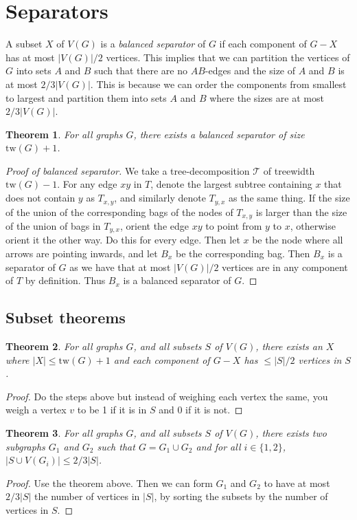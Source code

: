 \documentclass[]{article}
\newcommand{\tree}{\mathcal{T}}
\newcommand{\tw}{\text{tw}}
\newtheorem{theorem}{Theorem}
\theoremstyle{definition}
\numberwithin{theorem}{section}
\numberwithin{equation}{section}
\begin{document}
\section{Separators}
A subset $X$ of $V(G)$ is a \textit{balanced separator} of $G$ if each component of $G - X$ has at most $|V(G)|/2$ vertices. This implies that we can partition the vertices of $G$ into sets $A$ and $B$ such that there are no $AB$-edges and the size of $A$ and $B$ is at most $2/3 |V(G)|$. This is because we can order the components from smallest to largest and partition them into sets $A$ and $B$ where the sizes are at most $2/3 |V(G)|$.

\begin{theorem}
	For all graphs $G$, there exists a balanced separator of size $\tw(G) + 1$. 
\end{theorem}
\begin{proof}[Proof of balanced separator]
	We take a tree-decomposition $\tree$ of treewidth $\tw(G) - 1$. For any edge $xy$ in $T$, denote the largest subtree containing $x$ that does not contain $y$ as $T_{x,y}$, and similarly denote $T_{y, x}$ as the same thing. If the size of the union of the corresponding bags of the nodes of $T_{x,y}$ is larger than the size of the union of bags in $T_{y, x}$, orient the edge $xy$ to point from $y$ to $x$, otherwise orient it the other way. Do this for every edge. Then let $x$ be the node where all arrows are pointing inwards, and let $B_x$ be the corresponding bag. Then $B_x$ is a separator of $G$ as we have that at most $|V(G)|/2$ vertices are in any component of $T$ by definition. Thus $B_x$ is a balanced separator of $G$. 
\end{proof}

\subsection{Subset theorems}
\begin{theorem}
	For all graphs $G$, and all subsets $S$ of $V(G)$, there exists an $X$ where $|X| \leq \tw(G) + 1$ and each component of $G - X$ has $\leq |S|/2$ vertices in $S$. 
\end{theorem}
\begin{proof}
	Do the steps above but instead of weighing each vertex the same, you weigh a vertex $v$ to be 1 if it is in $S$ and 0 if it is not. 
\end{proof}

\begin{theorem}
	For all graphs $G$, and all subsets $S$ of $V(G)$, there exists  two subgraphs $G_1$ and $G_2$ such that $G = G_1 \cup G_2$ and for all $i \in \lbrace 1, 2 \rbrace$, $|S \cup V(G_i) | \leq 2/3 |S|$.
\end{theorem}
\begin{proof}
	Use the theorem above. Then we can form $G_1$ and $G_2$ to have at most $2/3 |S|$ the number of vertices in $|S|$, by sorting the subsets by the number of vertices in $S$. 
\end{proof}
\end{document}
